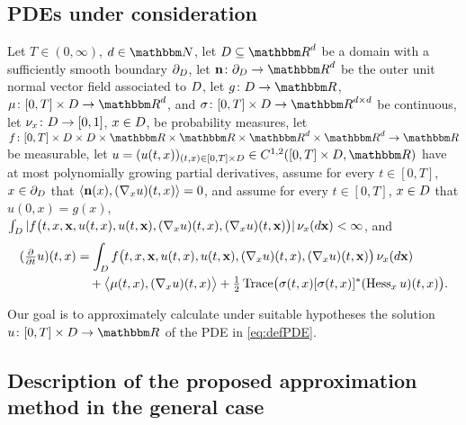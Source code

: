 \subsection{PDEs under consideration}
%
Let
$ T \in (0,\infty) $,
$ d \in \N $,
let
$\D \subseteq \R^d$
be a domain with a sufficiently smooth boundary
$\partial_D$,
let $ {\textbf n} \colon \partial_\D \to \R^d $ be the outer unit normal vector field associated to $D$,
let
$
g\colon \D \to \R
$,
$
\mu \colon [0,T] \times \D \to \R^d
$,
and
$
\sigma \colon [0,T] \times \D \to \R^{ d \times d }
$
be
continuous, let
$\nu_x \colon D \to [0,1]$,
$x \in D$,
be probability measures,
let
$
f \colon [0,T] \times \D \times \D \times \R \times \R \times \R^d \times \R^d \to \R
$
be measurable,
let
$
u=
(u(t,x))_{(t,x)\in [0,T]\times\D}\in C^{1,2}([0,T]\times\D,\R)
$
have at most polynomially growing partial derivatives, 
assume for every
$t\in [0,T]$,
$x\in \partial_D$
that
$ \left<{\textbf n}(x) ,(\nabla_x u)(t,x)\right> = 0$,
and assume for every
$t\in [0,T]$,
$x\in D$
that
$u(0,x)=g(x)$,
$\int_D |f\big(t,x,{\textbf x}, u(t,x),u(t,{\textbf x}), ( \nabla_x u )(t,x ),( \nabla_x u )(t,{\textbf x} ) \big) | \allowbreak \, \nu_x(d{\textbf x}) < \infty$,
and
\begin{equation}
\begin{split}
(\tfrac{\partial}{\partial t}u)(t,x)
&=
\int_{D} f\big(t,x,{\textbf x}, u(t,x),u(t,{\textbf x}), ( \nabla_x u )(t,x ),( \nabla_x u )(t,{\textbf x} ) \big) \, \nu_x(d{\textbf x}) \\
& \quad + \big\langle \mu(t,x), ( \nabla_x u )( t,x ) \big\rangle
+ \tfrac{ 1 }{ 2 }
\operatorname{Trace}\!\big(
\sigma(t,x) [ \sigma(t,x) ]^*
( \operatorname{Hess}_x u)( t,x )
\big).
\label{eq:defPDE}
\end{split}
\end{equation}

Our goal is to approximately calculate under suitable hypotheses the solution $u\colon [0,T]\times \D \to \R$ of the PDE in \eqref{eq:defPDE}.
%
%


\subsection{Description of the proposed approximation method in the general case}
\label{subsec:algo-Full-gen}


